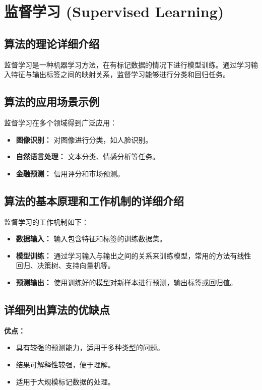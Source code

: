 \section{监督学习 (Supervised Learning)}
\subsection*{算法的理论详细介绍}
监督学习是一种机器学习方法，在有标记数据的情况下进行模型训练。通过学习输入特征与输出标签之间的映射关系，监督学习能够进行分类和回归任务。

\subsection*{算法的应用场景示例}
监督学习在多个领域得到广泛应用：
\begin{itemize}
    \item \textbf{图像识别：} 对图像进行分类，如人脸识别。
    \item \textbf{自然语言处理：} 文本分类、情感分析等任务。
    \item \textbf{金融预测：} 信用评分和市场预测。
\end{itemize}

\subsection*{算法的基本原理和工作机制的详细介绍}
监督学习的工作机制如下：
\begin{itemize}
    \item \textbf{数据输入：} 输入包含特征和标签的训练数据集。
    \item \textbf{模型训练：} 通过学习输入与输出之间的关系来训练模型，常用的方法有线性回归、决策树、支持向量机等。
    \item \textbf{预测输出：} 使用训练好的模型对新样本进行预测，输出标签或回归值。
\end{itemize}

\subsection*{详细列出算法的优缺点}
\textbf{优点：}
\begin{itemize}
    \item 具有较强的预测能力，适用于多种类型的问题。
    \item 结果可解释性较强，便于理解。
    \item 适用于大规模标记数据的处理。
\end{itemize}

